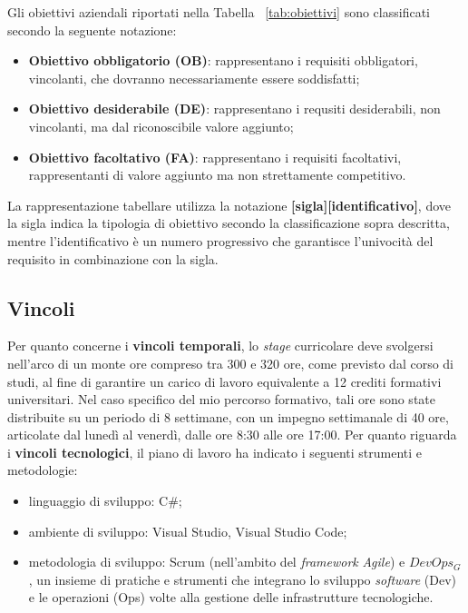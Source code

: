         \noindent Gli obiettivi aziendali riportati nella Tabella ~\ref{tab:obiettivi} sono classificati secondo la seguente notazione:
        \begin{itemize}
            \item \textbf{Obiettivo obbligatorio (OB)}: rappresentano i requisiti obbligatori, vincolanti, che dovranno necessariamente essere soddisfatti;
            \item \textbf{Obiettivo desiderabile (DE)}: rappresentano i requsiti desiderabili, non vincolanti, ma dal riconoscibile valore aggiunto;
            \item \textbf{Obiettivo facoltativo (FA)}: rappresentano i requisiti facoltativi, rappresentanti di valore aggiunto ma non strettamente competitivo.
        \end{itemize}
        La rappresentazione tabellare utilizza la notazione \textbf{[sigla][identificativo]}, dove la sigla indica la tipologia di obiettivo secondo la classificazione sopra descritta, mentre l’identificativo è un numero progressivo che garantisce l’univocità del requisito in combinazione con la sigla. 

        \subsection{Vincoli}
        
        Per quanto concerne i \textbf{vincoli temporali}, lo \textit{stage} curricolare deve svolgersi nell’arco di un monte ore compreso tra 300 e 320 ore, come previsto dal corso di studi, al fine di garantire un carico di lavoro equivalente a 12 crediti formativi universitari. Nel caso specifico del mio percorso formativo, tali ore sono state distribuite su un periodo di 8 settimane, con un impegno settimanale di 40 ore, articolate dal lunedì al venerdì, dalle ore 8:30 alle ore 17:00.   
        \newpage
        \noindent Per quanto riguarda i \textbf{vincoli tecnologici}, il piano di lavoro ha indicato i seguenti strumenti e metodologie:  
        \begin{itemize}
            \item linguaggio di sviluppo: C\#;
            \item ambiente di sviluppo: Visual Studio, Visual Studio Code;  
            \item metodologia di sviluppo: Scrum (nell’ambito del \textit{framework} \textit{Agile}) e $DevOps_G$, un insieme di pratiche e strumenti che integrano lo sviluppo \textit{software} (Dev) e le operazioni (Ops) volte alla gestione delle infrastrutture tecnologiche. 
        \end{itemize}

